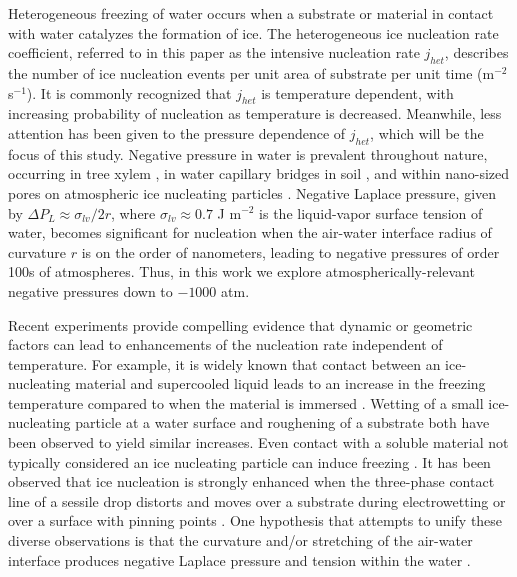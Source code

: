 \documentclass[journal abbreviation, manuscript]{copernicus}
\providecommand{\DIFadd}[1]{{\protect\color{blue}\uwave{#1}}} %
\providecommand{\DIFdel}[1]{{\protect\color{red}\sout{#1}}}                      %
\providecommand{\DIFaddbegin}{} %
\providecommand{\DIFaddend}{} %
\providecommand{\DIFdelbegin}{} %
\providecommand{\DIFdelend}{} %
\begin{document}
\introduction

Heterogeneous freezing of water occurs when a substrate or material in contact with water catalyzes the formation of ice. The heterogeneous ice nucleation rate coefficient, referred to in this paper as the intensive nucleation rate $j_{het}$, describes the number of ice nucleation events per unit area of substrate per unit time (m$^{-2}$ s$^{-1}$). It is commonly recognized that $j_{het}$ is temperature dependent, with increasing probability of nucleation as temperature is decreased. Meanwhile, less attention has been given to the pressure dependence of $j_{het}$, which will be the focus of this study. Negative pressure in water is prevalent throughout nature, occurring in tree xylem \citep{jacobsen2007xylem}, in water capillary bridges in soil \citep{seiphoori2020}, and within nano-sized pores on atmospheric ice nucleating particles \citep{david2020role,marcolli2020technical,klumpp2023comparing}. Negative Laplace pressure, given by \DIFdelbegin \DIFdel{$\Delta P_L \approx \sigma_{lv}/2r$}\DIFdelend \DIFaddbegin \DIFadd{$\Delta P \approx \sigma_{lv}/2r$}\DIFaddend , where $\sigma_{lv} \approx 0.7$ J m$^{-2}$ is the liquid-vapor surface tension of water, becomes significant for nucleation when the air-water interface radius of curvature $r$ is on the order of nanometers, leading to negative pressures of order 100s of atmospheres. Thus, in this work we explore atmospherically-relevant negative pressures down to $-1000$ atm. %

Recent experiments provide compelling evidence that dynamic or geometric factors can lead to enhancements of the nucleation rate independent of temperature. For example, it is widely known that contact between an ice-nucleating material and supercooled liquid leads to an increase in the freezing temperature compared to when the material is immersed \citep{pitter1973wind,levin1983contact,diehl2002ice}. Wetting of a small ice-nucleating particle at a water surface \citep{shaw2005} and roughening of a substrate \citep{gurganus2014nucleation} both have been observed to yield similar increases. Even contact with a soluble material not typically considered an ice nucleating particle can induce freezing \citep{niehaus2015}. It has been observed that ice nucleation is strongly enhanced when the three-phase contact line of a sessile drop distorts and moves over a substrate during electrowetting \citep{yang2015} or over a surface with pinning points \citep{yang2018}. One hypothesis that attempts to unify these diverse observations is that the curvature and/or stretching of the air-water interface produces negative Laplace pressure and tension within the water \citep{marcolli2017,yang2020}. 
\end{document}
